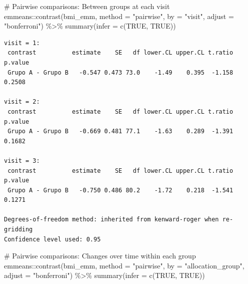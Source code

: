 \documentclass[
  letterpaper,
  DIV=11,
  numbers=noendperiod]{scrartcl}
\newenvironment{Shaded}{\begin{snugshade}}{\end{snugshade}}
\newcommand{\AttributeTok}[1]{\textcolor[rgb]{0.40,0.45,0.13}{#1}}
\newcommand{\CommentTok}[1]{\textcolor[rgb]{0.37,0.37,0.37}{#1}}
\newcommand{\ConstantTok}[1]{\textcolor[rgb]{0.56,0.35,0.01}{#1}}
\newcommand{\FunctionTok}[1]{\textcolor[rgb]{0.28,0.35,0.67}{#1}}
\newcommand{\NormalTok}[1]{\textcolor[rgb]{0.00,0.23,0.31}{#1}}
\newcommand{\SpecialCharTok}[1]{\textcolor[rgb]{0.37,0.37,0.37}{#1}}
\newcommand{\StringTok}[1]{\textcolor[rgb]{0.13,0.47,0.30}{#1}}
\begin{document}
\begin{Shaded}
\begin{Highlighting}[]
\CommentTok{\# Pairwise comparisons: Between groups at each visit}
\NormalTok{emmeans}\SpecialCharTok{::}\FunctionTok{contrast}\NormalTok{(bmi\_emm, }\AttributeTok{method =} \StringTok{"pairwise"}\NormalTok{, }\AttributeTok{by =} \StringTok{"visit"}\NormalTok{, }\AttributeTok{adjust =} \StringTok{"bonferroni"}\NormalTok{) }\SpecialCharTok{\%\textgreater{}\%} \FunctionTok{summary}\NormalTok{(}\AttributeTok{infer =} \FunctionTok{c}\NormalTok{(}\ConstantTok{TRUE}\NormalTok{, }\ConstantTok{TRUE}\NormalTok{))}
\end{Highlighting}
\end{Shaded}

\begin{verbatim}
visit = 1:
 contrast          estimate    SE   df lower.CL upper.CL t.ratio p.value
 Grupo A - Grupo B   -0.547 0.473 73.0    -1.49    0.395  -1.158  0.2508

visit = 2:
 contrast          estimate    SE   df lower.CL upper.CL t.ratio p.value
 Grupo A - Grupo B   -0.669 0.481 77.1    -1.63    0.289  -1.391  0.1682

visit = 3:
 contrast          estimate    SE   df lower.CL upper.CL t.ratio p.value
 Grupo A - Grupo B   -0.750 0.486 80.2    -1.72    0.218  -1.541  0.1271

Degrees-of-freedom method: inherited from kenward-roger when re-gridding 
Confidence level used: 0.95 
\end{verbatim}

\begin{Shaded}
\begin{Highlighting}[]
\CommentTok{\# Pairwise comparisons: Changes over time within each group}
\NormalTok{emmeans}\SpecialCharTok{::}\FunctionTok{contrast}\NormalTok{(bmi\_emm, }\AttributeTok{method =} \StringTok{"pairwise"}\NormalTok{, }\AttributeTok{by =} \StringTok{"allocation\_group"}\NormalTok{, }\AttributeTok{adjust =} \StringTok{"bonferroni"}\NormalTok{) }\SpecialCharTok{\%\textgreater{}\%} \FunctionTok{summary}\NormalTok{(}\AttributeTok{infer =} \FunctionTok{c}\NormalTok{(}\ConstantTok{TRUE}\NormalTok{, }\ConstantTok{TRUE}\NormalTok{))}
\end{Highlighting}
\end{Shaded}
\end{document}
